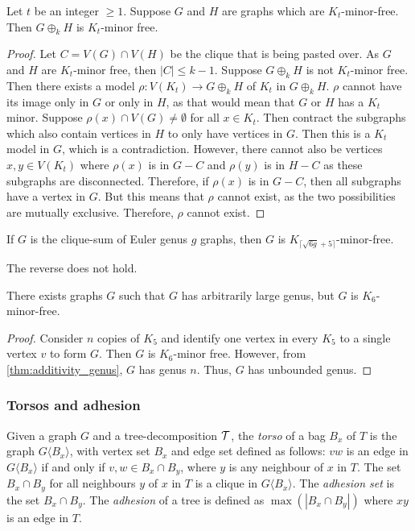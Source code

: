 \begin{lemma}
	Let $t$ be an integer $\geq 1$. Suppose $G$ and $H$ are graphs which are $K_t$-minor-free. Then $G \oplus_k H$ is $K_{t}$-minor free. 
\end{lemma}
\begin{proof}
	Let $C = V(G) \cap V(H)$ be the clique that is being pasted over. As $G$ and $H$ are $K_t$-minor free, then $|C| \leq k - 1$. Suppose $G \oplus_k H$ is not $K_t$-minor free. Then there exists a model $\rho: V(K_t) \rightarrow G\oplus_k H$ of $K_t$ in $G \oplus_k H$. $\rho$ cannot have its image only in $G$ or only in $H$, as that would mean that $G$ or $H$ has a $K_t$ minor. Suppose $\rho(x) \cap V(G) \neq \emptyset$ for all $x \in K_t$. Then contract the subgraphs which also contain vertices in $H$ to only have vertices in $G$. Then this is a $K_t$ model in $G$, which is a contradiction. However, there cannot also be vertices $x, y \in V(K_t)$ where $\rho(x)$ is in $G - C$ and $\rho(y)$ is in $H - C$ as these subgraphs are disconnected. Therefore, if $\rho(x)$ is in $G - C$, then all subgraphs have a vertex in $G$. But this means that $\rho$ cannot exist, as the two possibilities are mutually exclusive. Therefore, $\rho$ cannot exist. 
\end{proof}

\begin{corollary}\label{corr:clique_sum_genus}
	If \(G\) is the clique-sum of Euler genus \(g\) graphs, then \(G\) is \(K_{\lceil \sqrt{6g} + 5 \rceil}\)-minor-free.
\end{corollary}
The reverse does not hold. 
\begin{lemma}
	There exists graphs $G$ such that \(G\) has arbitrarily large genus, but $G$ is \(K_{6}\)-minor-free.
\end{lemma}

\begin{proof}
	Consider $n$ copies of $K_5$ and identify one vertex in every $K_5$ to a single vertex $v$ to form $G$. Then $G$ is $K_6$-minor free. However, from \cref{thm:additivity_genus}, $G$ has genus $n$. Thus, $G$ has unbounded genus. 
\end{proof}

\subsubsection{Torsos and adhesion}\label{sssec:Torsos and Adhesion}
Given a graph \(G\) and a tree-decomposition \(\mathcal{T}\), the \textit{torso} of a bag \(B_x\) of \(T\) is the graph \(G\langle B_x \rangle\), with vertex set $B_x$ and edge set defined as follows: \(vw\) is an edge in \(G\langle B_x \rangle\) if and only if \(v,w \in B_x \cap B_y\), where \(y\) is any neighbour of \(x\) in \(T\). The set \(B_x \cap B_y\) for all neighbours \(y\) of \(x\) in \(T\) is a clique in \(G\langle B_x \rangle\).
The \textit{adhesion set} is the set \(B_x \cap B_y\). 
The \textit{adhesion} of a tree is defined as \(\max(|B_x \cap B_y|)\) where \(xy\) is an edge in \(T\).

